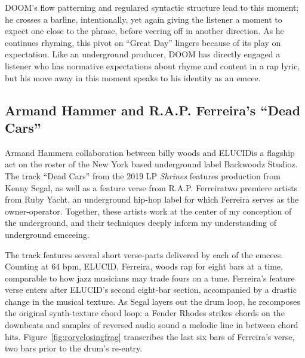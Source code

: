 DOOM's flow patterning and regulared syntactic structure lead to this moment; he crosses a barline, 
intentionally, yet again giving the listener a moment to expect one close to the phrase, before veering
off in another direction. As he continues rhyming, this pivot on ``Great Day'' lingers because of its
play on expectation. Like an underground producer, DOOM has directly engaged a listener who has normative
expectations about rhyme and content in a rap lyric, but his move away in this moment speaks to his
identity as an emcee.

{}
\subsection*{\centering Armand Hammer and R.A.P. Ferreira's ``Dead Cars''}

Armand Hammer\textemdash a collaboration between billy woods and ELUCID\textemdash is a flagship act on
the roster of the New York based underground label Backwoodz Studioz. The track ``Dead Cars'' from the 
2019 LP \textit{Shrines} features production from Kenny Segal, as well as a feature verse from R.A.P. 
Ferreira\textemdash two premiere artists from Ruby Yacht, an underground hip-hop label for which Ferreira
serves as the owner-operator. Together, these artists work at the center of my conception of the underground,
and their techniques deeply inform my understanding of underground emceeing.

The track features several short verse-parts delivered by each of the emcees. Counting at 64 bpm, ELUCID, 
Ferreira, woods  rap for eight bars at a time, comparable to how jazz musicians may trade fours on a tune.
Ferreira's feature verse enters after ELUCID's second eight-bar section, accompanied by a drastic change 
in the musical texture. As Segal layers out the drum loop, he recomposes the original synth-texture chord
loop: a Fender Rhodes strikes chords on the downbeats and samples of reversed audio sound a melodic line
in between chord hits. Figure~\ref{fig:roryclosingfrag} transcribes the last six bars of Ferreira's verse, 
two bars prior to the drum's re-entry.

